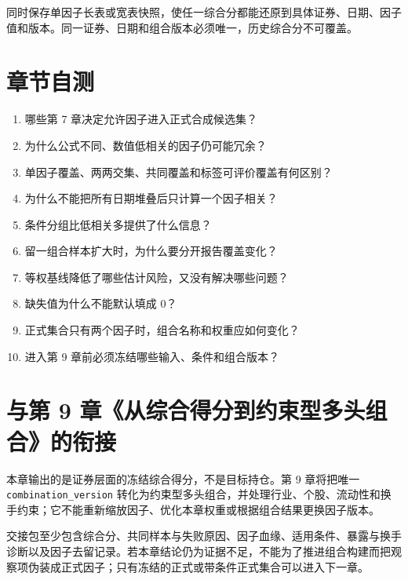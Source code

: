 同时保存单因子长表或宽表快照，使任一综合分都能还原到具体证券、日期、因子值和版本。同一证券、日期和组合版本必须唯一，历史综合分不可覆盖。

\section{章节自测}

\begin{quizbox}
\begin{enumerate}
  \item 哪些第 7 章决定允许因子进入正式合成候选集？
  \item 为什么公式不同、数值低相关的因子仍可能冗余？
  \item 单因子覆盖、两两交集、共同覆盖和标签可评价覆盖有何区别？
  \item 为什么不能把所有日期堆叠后只计算一个因子相关？
  \item 条件分组比低相关多提供了什么信息？
  \item 留一组合样本扩大时，为什么要分开报告覆盖变化？
  \item 等权基线降低了哪些估计风险，又没有解决哪些问题？
  \item 缺失值为什么不能默认填成 0？
  \item 正式集合只有两个因子时，组合名称和权重应如何变化？
  \item 进入第 9 章前必须冻结哪些输入、条件和组合版本？
\end{enumerate}
\end{quizbox}

\section{与第 9 章《从综合得分到约束型多头组合》的衔接}

本章输出的是证券层面的冻结综合得分，不是目标持仓。第 9 章将把唯一 \texttt{combination\_version} 转化为约束型多头组合，并处理行业、个股、流动性和换手约束；它不能重新缩放因子、优化本章权重或根据组合结果更换因子版本。

交接包至少包含综合分、共同样本与失败原因、因子血缘、适用条件、暴露与换手诊断以及因子去留记录。若本章结论仍为证据不足，不能为了推进组合构建而把观察项伪装成正式因子；只有冻结的正式或带条件正式集合可以进入下一章。
